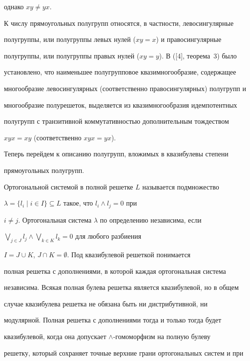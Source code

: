 однако $xy\ne yx$.





К числу прямоугольных полугрупп относятся, в частности, левосингулярные


полугруппы, или полугруппы левых нулей ($xy=x$) и правосингулярные


полугруппы, или полугруппы правых нулей ($xy=y$). В ([4], теорема~3) было


установлено, что наименьшее полугрупповое квазимногообразие, содержащее


многообразие левосингулярных (соответственно правосингулярных) полугрупп и


многообразие полурешеток, выделяется из квазимногообразия идемпотентных


полугрупп с транзитивной коммутативностью дополнительным тождеством


$xyx=xy$ (соответственно $xyx=yx$).





Теперь перейдем к описанию полугрупп, вложимых в квазибулевы степени


прямоугольных полугрупп.





Ортогональной системой в полной решетке $L$ называется подмножество


$\lambda=\{l_i\mid i\in I\}\subseteq L$ такое, что $l_i\wedge l_j=0$ при


$i\ne j$. Ортогональная система $\lambda$ по определению независима, если


$\bigvee_{j\in J} l_j\wedge\bigvee_{k\in K} l_k=0$ для любого разбиения


$I=J\cup K$, $J\cap K=\emptyset$. Под квазибулевой решеткой понимается


полная решетка с дополнениями, в которой каждая ортогональная система


независима. Всякая полная булева решетка является квазибулевой, но в общем


случае квазибулева решетка не обязана быть ни дистрибутивной, ни


модулярной. Полная решетка с дополнениями тогда и только тогда будет


квазибулевой, когда она допускает $\wedge$-гомоморфизм на полную булеву


решетку, который сохраняет точные верхние грани ортогональных систем и при


